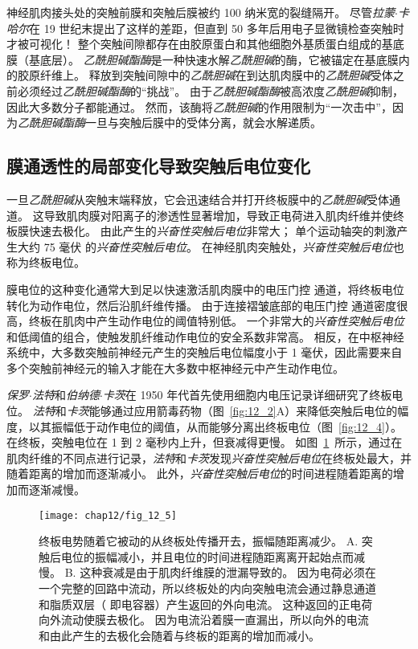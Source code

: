 神经肌肉接头处的突触前膜和突触后膜被约 100 纳米宽的裂缝隔开。
尽管\textit{拉蒙$\cdot$卡哈尔}在 19 世纪末提出了这样的差距，但直到 50 多年后用电子显微镜检查突触时才被可视化！
整个突触间隙都存在由胶原蛋白和其他细胞外基质蛋白组成的基底膜（基底层）。
\textit{乙酰胆碱酯酶}是一种快速水解\textit{乙酰胆碱}的酶，它被锚定在基底膜内的胶原纤维上。
释放到突触间隙中的\textit{乙酰胆碱}在到达肌肉膜中的\textit{乙酰胆碱}受体之前必须经过\textit{乙酰胆碱酯酶}的“挑战”。
由于\textit{乙酰胆碱酯酶}被高浓度\textit{乙酰胆碱}抑制，因此大多数分子都能通过。
然而，该酶将\textit{乙酰胆碱}的作用限制为“一次击中”，因为\textit{乙酰胆碱酯酶}一旦与突触后膜中的受体分离，就会水解递质。



\subsection{膜通透性的局部变化导致突触后电位变化}

一旦\textit{乙酰胆碱}从突触末端释放，它会迅速结合并打开终板膜中的\textit{乙酰胆碱}受体通道。
这导致肌肉膜对阳离子的渗透性显著增加，导致正电荷进入肌肉纤维并使终板膜快速去极化。
由此产生的\textit{兴奋性突触后电位}非常大；
单个运动轴突的刺激产生大约 75 毫伏 的\textit{兴奋性突触后电位}。
在神经肌肉突触处，\textit{兴奋性突触后电位}也称为终板电位。


膜电位的这种变化通常大到足以快速激活肌肉膜中的电压门控  通道，将终板电位转化为动作电位，然后沿肌纤维传播。
由于连接褶皱底部的电压门控  通道密度很高，终板在肌肉中产生动作电位的阈值特别低。
一个非常大的\textit{兴奋性突触后电位}和低阈值的组合，使触发肌纤维动作电位的安全系数非常高。
相反，在中枢神经系统中，大多数突触前神经元产生的突触后电位幅度小于 1 毫伏，因此需要来自多个突触前神经元的输入才能在大多数中枢神经元中产生动作电位。


\textit{保罗$\cdot$法特}和\textit{伯纳德$\cdot$卡茨}在 1950 年代首先使用细胞内电压记录详细研究了终板电位。
\textit{法特}和\textit{卡茨}能够通过应用箭毒药物（图~\ref{fig:12_2}A）来降低突触后电位的幅度，以其振幅低于动作电位的阈值，从而能够分离出终板电位（图~\ref{fig:12_4}）。
在终板，突触电位在 1 到 2 毫秒内上升，但衰减得更慢。
如图~\ref{fig:12_5}~所示，通过在肌肉纤维的不同点进行记录，\textit{法特}和\textit{卡茨}发现\textit{兴奋性突触后电位}在终板处最大，并随着距离的增加而逐渐减小。
此外，\textit{兴奋性突触后电位}的时间进程随着距离的增加而逐渐减慢。


\begin{figure}[htbp]
	\centering
	\texttt{[image: chap12/fig\_12\_5]}
	\caption{终板电势随着它被动的从终板处传播开去，振幅随距离减少。
		A. 突触后电位的振幅减小，并且电位的时间进程随距离离开起始点而减慢。
		B. 这种衰减是由于肌肉纤维膜的泄漏导致的。
		因为电荷必须在一个完整的回路中流动，所以终板处的内向突触电流会通过静息通道和脂质双层（ 即电容器）产生返回的外向电流。 
		这种返回的正电荷向外流动使膜去极化。 
		因为电流沿着膜一直漏出，所以向外的电流和由此产生的去极化会随着与终板的距离的增加而减小。}
	\label{fig:12_5}
\end{figure}


